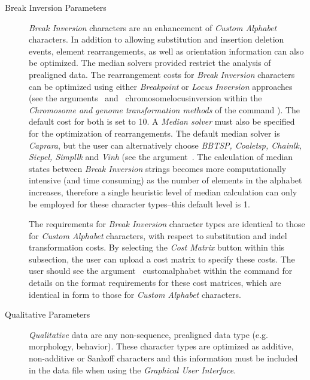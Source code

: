 \begin{description}
	\item [Break Inversion Parameters] \emph{Break Inversion} characters are an enhancement of 				
		\emph{Custom Alphabet} characters. In addition to allowing substitution and insertion deletion events, 
		element rearrangements, as well as orientation information can also be optimized.
		The median solvers provided restrict the analysis of prealigned data. 
		 The rearrangement costs for \emph{Break Inversion} characters can be optimized using 
		 either \emph{Breakpoint} or \emph{Locus Inversion} approaches (see the 
		 arguments~ and~
		 {chromosomelocusinversion} within the \emph{Chromosome and genome transformation methods} of the command 
		 ). The default cost for both is set to 10. A \emph{Median solver} must also be 
		 specified for the optimization of rearrangements. The default median solver is \emph{Caprara}, 
		 but the user can alternatively choose \emph{BBTSP, Coaletsp, Chainlk, Siepel, Simpllk} and 
		 \emph{Vinh} (see the argument~.  
		 The calculation of median states between 
		 \emph {Break Inversion} strings becomes more computationally intensive (and time consuming) 
		 as the number of elements in the alphabet increases, therefore a single heuristic level 
		 of median calculation can only be employed for these character types--this default level is 1.
		 
		\indent The requirements for \emph{Break Inversion} character types are identical to those for 
		 \emph{Custom Alphabet} characters, with respect to substitution and indel transformation costs. 
		 By selecting the  \emph{Cost Matrix} button within this subsection, the user can upload a 
		 cost matrix to specify these costs. The user should see the argument~
		 {customalphabet} within the command  for details on the format requirements 
		 for these cost matrices, which are identical in form to those for \emph{Custom Alphabet} characters.
 	
	\item [Qualitative Parameters] \emph{Qualitative} data are any non-sequence, prealigned 
		data type (e.g. morphology, behavior). These character types are optimized as additive, 
		non-additive or Sankoff characters and this information must be included in the data file when 
		using the \emph{Graphical User Interface}.

	\end{description}
		
